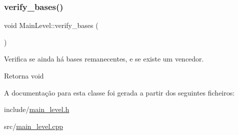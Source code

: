 \subsubsection{\texorpdfstring{verify\+\_\+bases()}{verify\_bases()}}
{\footnotesize\ttfamily void Main\+Level\+::verify\+\_\+bases (\begin{DoxyParamCaption}{ }\end{DoxyParamCaption})\hspace{0.3cm}{\ttfamily [protected]}}



Verifica se ainda há bases remanecentes, e se existe um vencedor. 

\begin{DoxyReturn}{Retorna}
void 
\end{DoxyReturn}


A documentação para esta classe foi gerada a partir dos seguintes ficheiros\+:\begin{DoxyCompactItemize}
\item 
include/\mbox{\hyperlink{main__level_8h}{main\+\_\+level.\+h}}\item 
src/\mbox{\hyperlink{main__level_8cpp}{main\+\_\+level.\+cpp}}\end{DoxyCompactItemize}
